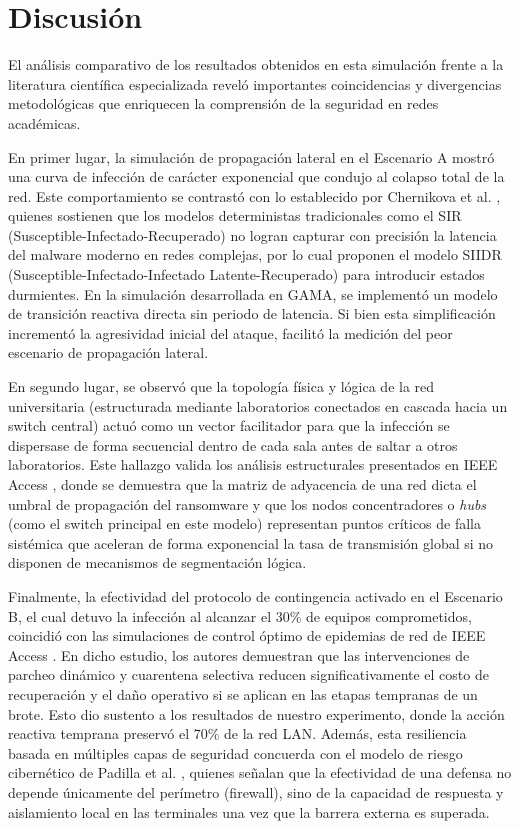 \section{Discusión}

El análisis comparativo de los resultados obtenidos en esta simulación frente a la literatura científica especializada reveló importantes coincidencias y divergencias metodológicas que enriquecen la comprensión de la seguridad en redes académicas.

En primer lugar, la simulación de propagación lateral en el Escenario A mostró una curva de infección de carácter exponencial que condujo al colapso total de la red. Este comportamiento se contrastó con lo establecido por Chernikova et al. \cite{chernikova2023modeling}, quienes sostienen que los modelos deterministas tradicionales como el SIR (Susceptible-Infectado-Recuperado) no logran capturar con precisión la latencia del malware moderno en redes complejas, por lo cual proponen el modelo SIIDR (Susceptible-Infectado-Infectado Latente-Recuperado) para introducir estados durmientes. En la simulación desarrollada en GAMA, se implementó un modelo de transición reactiva directa sin periodo de latencia. Si bien esta simplificación incrementó la agresividad inicial del ataque, facilitó la medición del peor escenario de propagación lateral.

En segundo lugar, se observó que la topología física y lógica de la red universitaria (estructurada mediante laboratorios conectados en cascada hacia un switch central) actuó como un vector facilitador para que la infección se dispersase de forma secuencial dentro de cada sala antes de saltar a otros laboratorios. Este hallazgo valida los análisis estructurales presentados en IEEE Access \cite{ieee2019spreading}, donde se demuestra que la matriz de adyacencia de una red dicta el umbral de propagación del ransomware y que los nodos concentradores o \textit{hubs} (como el switch principal en este modelo) representan puntos críticos de falla sistémica que aceleran de forma exponencial la tasa de transmisión global si no disponen de mecanismos de segmentación lógica.

Finalmente, la efectividad del protocolo de contingencia activado en el Escenario B, el cual detuvo la infección al alcanzar el 30\% de equipos comprometidos, coincidió con las simulaciones de control óptimo de epidemias de red de IEEE Access \cite{ieee2025optimal}. En dicho estudio, los autores demuestran que las intervenciones de parcheo dinámico y cuarentena selectiva reducen significativamente el costo de recuperación y el daño operativo si se aplican en las etapas tempranas de un brote. Esto dio sustento a los resultados de nuestro experimento, donde la acción reactiva temprana preservó el 70\% de la red LAN. Además, esta resiliencia basada en múltiples capas de seguridad concuerda con el modelo de riesgo cibernético de Padilla et al. \cite{padilla2025serdux}, quienes señalan que la efectividad de una defensa no depende únicamente del perímetro (firewall), sino de la capacidad de respuesta y aislamiento local en las terminales una vez que la barrera externa es superada.
